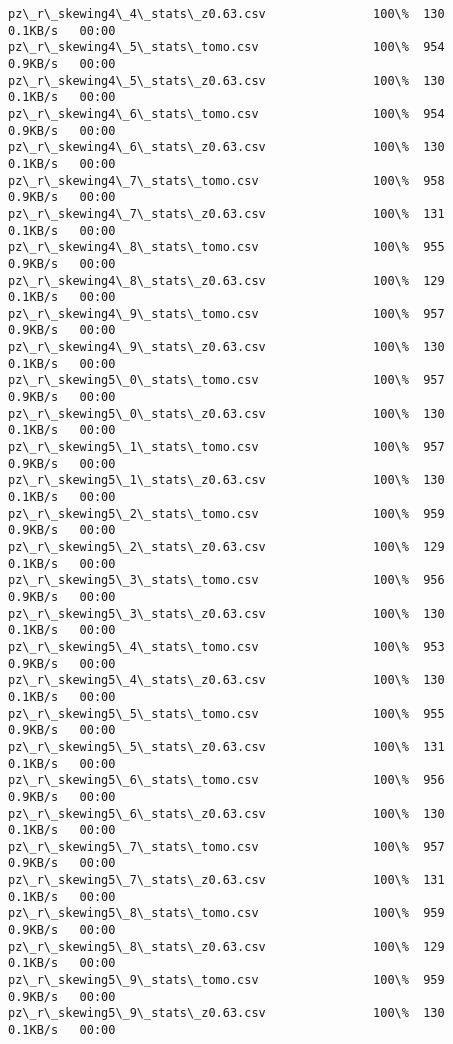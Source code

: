 \documentclass[11pt]{article}
\begin{document}
\begin{Verbatim}[commandchars=\\\{\}]
pz\_r\_skewing4\_4\_stats\_z0.63.csv               100\%  130     0.1KB/s   00:00    
pz\_r\_skewing4\_5\_stats\_tomo.csv                100\%  954     0.9KB/s   00:00    
pz\_r\_skewing4\_5\_stats\_z0.63.csv               100\%  130     0.1KB/s   00:00    
pz\_r\_skewing4\_6\_stats\_tomo.csv                100\%  954     0.9KB/s   00:00    
pz\_r\_skewing4\_6\_stats\_z0.63.csv               100\%  130     0.1KB/s   00:00    
pz\_r\_skewing4\_7\_stats\_tomo.csv                100\%  958     0.9KB/s   00:00    
pz\_r\_skewing4\_7\_stats\_z0.63.csv               100\%  131     0.1KB/s   00:00    
pz\_r\_skewing4\_8\_stats\_tomo.csv                100\%  955     0.9KB/s   00:00    
pz\_r\_skewing4\_8\_stats\_z0.63.csv               100\%  129     0.1KB/s   00:00    
pz\_r\_skewing4\_9\_stats\_tomo.csv                100\%  957     0.9KB/s   00:00    
pz\_r\_skewing4\_9\_stats\_z0.63.csv               100\%  130     0.1KB/s   00:00    
pz\_r\_skewing5\_0\_stats\_tomo.csv                100\%  957     0.9KB/s   00:00    
pz\_r\_skewing5\_0\_stats\_z0.63.csv               100\%  130     0.1KB/s   00:00    
pz\_r\_skewing5\_1\_stats\_tomo.csv                100\%  957     0.9KB/s   00:00    
pz\_r\_skewing5\_1\_stats\_z0.63.csv               100\%  130     0.1KB/s   00:00    
pz\_r\_skewing5\_2\_stats\_tomo.csv                100\%  959     0.9KB/s   00:00    
pz\_r\_skewing5\_2\_stats\_z0.63.csv               100\%  129     0.1KB/s   00:00    
pz\_r\_skewing5\_3\_stats\_tomo.csv                100\%  956     0.9KB/s   00:00    
pz\_r\_skewing5\_3\_stats\_z0.63.csv               100\%  130     0.1KB/s   00:00    
pz\_r\_skewing5\_4\_stats\_tomo.csv                100\%  953     0.9KB/s   00:00    
pz\_r\_skewing5\_4\_stats\_z0.63.csv               100\%  130     0.1KB/s   00:00    
pz\_r\_skewing5\_5\_stats\_tomo.csv                100\%  955     0.9KB/s   00:00    
pz\_r\_skewing5\_5\_stats\_z0.63.csv               100\%  131     0.1KB/s   00:00    
pz\_r\_skewing5\_6\_stats\_tomo.csv                100\%  956     0.9KB/s   00:00    
pz\_r\_skewing5\_6\_stats\_z0.63.csv               100\%  130     0.1KB/s   00:00    
pz\_r\_skewing5\_7\_stats\_tomo.csv                100\%  957     0.9KB/s   00:00    
pz\_r\_skewing5\_7\_stats\_z0.63.csv               100\%  131     0.1KB/s   00:00    
pz\_r\_skewing5\_8\_stats\_tomo.csv                100\%  959     0.9KB/s   00:00    
pz\_r\_skewing5\_8\_stats\_z0.63.csv               100\%  129     0.1KB/s   00:00    
pz\_r\_skewing5\_9\_stats\_tomo.csv                100\%  959     0.9KB/s   00:00    
pz\_r\_skewing5\_9\_stats\_z0.63.csv               100\%  130     0.1KB/s   00:00    

\end{Verbatim}
\end{document}
